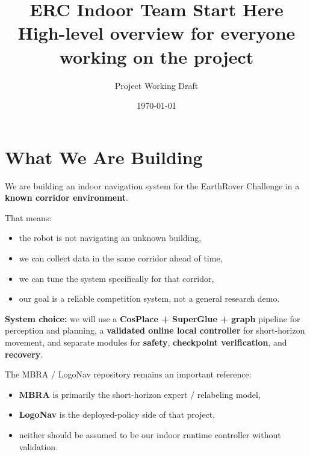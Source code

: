 \documentclass[11pt,a4paper]{article}
\title{ERC Indoor Team Start Here\\[0.3em]
\large High-level overview for everyone working on the project}
\author{Project Working Draft}
\date{\today}
\begin{document}
\maketitle
\begin{center}
\end{center}
\vspace{1em}

\section{What We Are Building}

We are building an indoor navigation system for the EarthRover Challenge in a
\textbf{known corridor environment}.

That means:

\begin{itemize}[nosep]
  \item the robot is not navigating an unknown building,
  \item we can collect data in the same corridor ahead of time,
  \item we can tune the system specifically for that corridor,
  \item our goal is a reliable competition system, not a general research demo.
\end{itemize}

\begin{mdframed}
\textbf{System choice:} we will use a \textbf{CosPlace + SuperGlue + graph}
pipeline for perception and planning, a \textbf{validated online local controller}
for short-horizon movement, and separate modules for \textbf{safety},
\textbf{checkpoint verification}, and \textbf{recovery}.

The MBRA / LogoNav repository remains an important reference:

\begin{itemize}[nosep]
  \item \textbf{MBRA} is primarily the short-horizon expert / relabeling model,
  \item \textbf{LogoNav} is the deployed-policy side of that project,
  \item neither should be assumed to be our indoor runtime controller without validation.
\end{itemize}
\end{mdframed}
\end{document}
